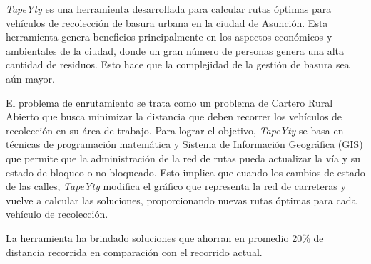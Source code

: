 \begin{resumen}
\textit{TapeYty} es una herramienta desarrollada para calcular rutas óptimas para vehículos de recolección de basura urbana en la ciudad de Asunción. Esta herramienta genera beneficios principalmente en los aspectos económicos y ambientales de la ciudad, donde un gran número de personas genera una alta cantidad de residuos. Esto hace que la complejidad de la gestión de basura sea aún mayor.

El problema de enrutamiento se trata como un problema de Cartero Rural Abierto que busca minimizar la distancia que deben recorrer los vehículos de recolección en su área de trabajo. Para lograr el objetivo, \textit{TapeYty} se basa en técnicas de programación matemática y Sistema de Información Geográfica (GIS) que permite que la administración de la red de rutas pueda actualizar la vía y su estado de bloqueo o no bloqueado. Esto implica que cuando los cambios de estado de las calles, \textit{TapeYty} modifica el gráfico que representa la red de carreteras y vuelve a calcular las soluciones, proporcionando nuevas rutas óptimas para cada vehículo de recolección.

La herramienta ha brindado soluciones que ahorran en promedio 20\% de distancia recorrida en comparación con el recorrido actual.
\end{resumen}